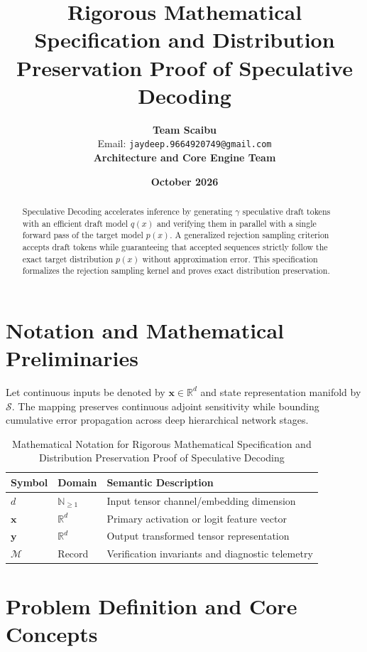 \documentclass[11pt,a4paper]{article}
\title{\textbf{Rigorous Mathematical Specification and Distribution Preservation Proof of Speculative Decoding}}
\author{\textbf{Team Scaibu} \\ \small Email: \texttt{jaydeep.9664920749@gmail.com} \\ \small \textbf{Architecture and Core Engine Team}}
\date{\textbf{October 2026}}
\theoremstyle{definition}
\begin{document}
\maketitle

\begin{abstract}
Speculative Decoding accelerates inference by generating $\gamma$ speculative draft tokens with an efficient draft model $q(x)$ and verifying them in parallel with a single forward pass of the target model $p(x)$. A generalized rejection sampling criterion accepts draft tokens while guaranteeing that accepted sequences strictly follow the exact target distribution $p(x)$ without approximation error. This specification formalizes the rejection sampling kernel and proves exact distribution preservation.
\end{abstract}

\section{Notation and Mathematical Preliminaries}

Let continuous inputs be denoted by $\mathbf{x} \in \mathbb{R}^d$ and state representation manifold by $\mathcal{S}$. The mapping preserves continuous adjoint sensitivity while bounding cumulative error propagation across deep hierarchical network stages.

\begin{table}[h]
\centering
\caption{Mathematical Notation for Rigorous Mathematical Specification and Distribution Preservation Proof of Speculative Decoding}
\begin{tabular}{lll}
\toprule
\textbf{Symbol} & \textbf{Domain} & \textbf{Semantic Description} \\
\midrule
$d$ & $\mathbb{N}_{\ge 1}$ & Input tensor channel/embedding dimension \\
$\mathbf{x}$ & $\mathbb{R}^d$ & Primary activation or logit feature vector \\
$\mathbf{y}$ & $\mathbb{R}^d$ & Output transformed tensor representation \\
$\mathcal{M}$ & Record & Verification invariants and diagnostic telemetry \\
\bottomrule
\end{tabular}
\end{table}

\section{Problem Definition and Core Concepts}
\end{document}

